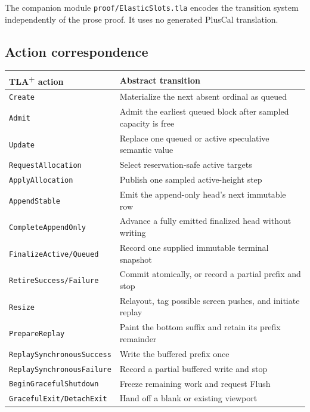 \documentclass[11pt]{article}
\theoremstyle{definition}
\begin{document}
The companion module \texttt{proof/ElasticSlots.tla} encodes the transition
system independently of the prose proof.  It uses no generated PlusCal
translation.

\subsection{Action correspondence}

\begin{center}
\begin{tabular}{@{}>{\raggedright\arraybackslash}p{}
                    >{\raggedright\arraybackslash}p{}@{}}
\toprule
TLA\textsuperscript{+} action & Abstract transition\\
\midrule
\texttt{Create} & Materialize the next absent ordinal as queued\\
\texttt{Admit} & Admit the earliest queued block after sampled capacity is free\\
\texttt{Update} & Replace one queued or active speculative semantic value\\
\texttt{RequestAllocation} & Select reservation-safe active targets\\
\texttt{ApplyAllocation} & Publish one sampled active-height step\\
\texttt{AppendStable} & Emit the append-only head's next immutable row\\
\texttt{CompleteAppendOnly} & Advance a fully emitted finalized head without writing\\
\texttt{FinalizeActive/Queued} & Record one supplied immutable terminal snapshot\\
\texttt{RetireSuccess/Failure} & Commit atomically, or record a partial prefix and stop\\
\texttt{Resize} & Relayout, tag possible screen pushes, and initiate replay\\
\texttt{PrepareReplay} & Paint the bottom suffix and retain its prefix remainder\\
\texttt{ReplaySynchronousSuccess} & Write the buffered prefix once\\
\texttt{ReplaySynchronousFailure} & Record a partial buffered write and stop\\
\texttt{BeginGracefulShutdown} & Freeze remaining work and request Flush\\
\texttt{GracefulExit/DetachExit} & Hand off a blank or existing viewport\\
\bottomrule
\end{tabular}
\end{center}
\end{document}
